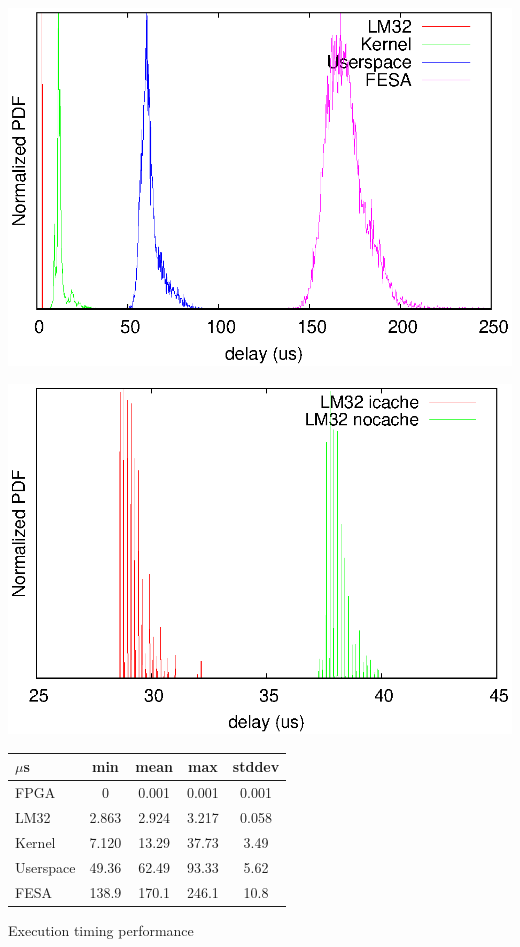 \documentclass[25pt,halfparskip-,pagesize]{scrartcl}
\begin{document}
\begin{multicols*}{3}
\includegraphics[width=\columnwidth]{../images/WEPD48f1}

\includegraphics[width=\columnwidth]{../images/lm32plot}


   \centering
   \begin{tabular}{l|c|c|c|c}
     $\mu$s    & min   & mean  & max   & stddev \\
     \hline
     FPGA      & 0 & 0.001 & 0.001 & 0.001 \\
     LM32      & 2.863 & 2.924 & 3.217 & 0.058  \\
     Kernel    & 7.120 & 13.29 & 37.73 & 3.49   \\
     Userspace & 49.36 & 62.49 & 93.33 & 5.62   \\
     FESA      & 138.9 & 170.1 & 246.1 & 10.8 \\
   \end{tabular}
   \caption{Execution timing performance}
  \label{tab:stat_table}




\end{multicols*}
\end{document}
